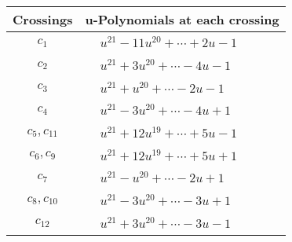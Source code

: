 \documentclass[1p]{elsarticle_modified}
\theoremstyle{definition}
\begin{document}
\begin{tabular}{m{50pt}|m{274pt}}
Crossings & \hspace{64pt}u-Polynomials at each crossing \\
\hline $$\begin{aligned}c_{1}\end{aligned}$$&$\begin{aligned}
&u^{21}-11 u^{20}+\cdots+2 u-1
\end{aligned}$\\
\hline $$\begin{aligned}c_{2}\end{aligned}$$&$\begin{aligned}
&u^{21}+3 u^{20}+\cdots-4 u-1
\end{aligned}$\\
\hline $$\begin{aligned}c_{3}\end{aligned}$$&$\begin{aligned}
&u^{21}+u^{20}+\cdots-2 u-1
\end{aligned}$\\
\hline $$\begin{aligned}c_{4}\end{aligned}$$&$\begin{aligned}
&u^{21}-3 u^{20}+\cdots-4 u+1
\end{aligned}$\\
\hline $$\begin{aligned}c_{5},c_{11}\end{aligned}$$&$\begin{aligned}
&u^{21}+12 u^{19}+\cdots+5 u-1
\end{aligned}$\\
\hline $$\begin{aligned}c_{6},c_{9}\end{aligned}$$&$\begin{aligned}
&u^{21}+12 u^{19}+\cdots+5 u+1
\end{aligned}$\\
\hline $$\begin{aligned}c_{7}\end{aligned}$$&$\begin{aligned}
&u^{21}- u^{20}+\cdots-2 u+1
\end{aligned}$\\
\hline $$\begin{aligned}c_{8},c_{10}\end{aligned}$$&$\begin{aligned}
&u^{21}-3 u^{20}+\cdots-3 u+1
\end{aligned}$\\
\hline $$\begin{aligned}c_{12}\end{aligned}$$&$\begin{aligned}
&u^{21}+3 u^{20}+\cdots-3 u-1
\end{aligned}$\\
\hline
\end{tabular}\\~\\
\end{document}
